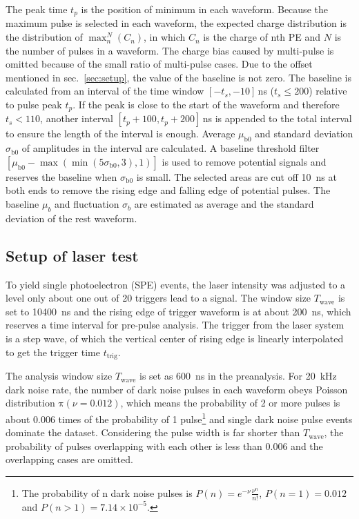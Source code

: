 The peak time $t_p$ is the position of minimum in each waveform. Because the maximum pulse is selected in each waveform, the expected charge distribution is the distribution of $\max_n^N(C_n)$, in which $C_n$ is the charge of nth PE and $N$ is the number of pulses in a waveform. The charge bias caused by multi-pulse is omitted because of the small ratio of multi-pulse cases. Due to the offset mentioned in sec.~\ref{sec:setup}, the value of the baseline is not zero. The baseline is calculated from an interval of the time window $[-t_s,-10]$\,ns ($t_s\leq200$) relative to pulse peak $t_p$. If the peak is close to the start of the waveform and therefore $t_s < 110$, another interval $[t_p+100,t_p+200]$\,ns is appended to the total interval to ensure the length of the interval is enough. Average $\mu_{\mathrm{b0}}$ and standard deviation $\sigma_{\mathrm{b0}}$ of amplitudes in the interval are calculated. A baseline threshold filter $[\mu_{\mathrm{b0}}-\max(\min(5\sigma_{\mathrm{b0}},3),1)]$ is used to remove potential signals and reserves the baseline when $\sigma_{\mathrm{b0}}$ is small. The selected areas are cut off \SI{10}{ns} at both ends to remove the rising edge and falling edge of potential pulses. The baseline $\mu_b$ and fluctuation $\sigma_b$ are estimated as average and the standard deviation of the rest waveform.

\subsection{Setup of laser test}
To yield single photoelectron (SPE) events, the laser intensity was adjusted to a level only about one out of 20 triggers lead to a signal. The window size $T_{\mathrm{wave}}$ is set to \SI{10400}{ns} and the rising edge of trigger waveform is at about \SI{200}{ns}, which reserves a time interval for pre-pulse analysis. The trigger from the laser system is a step wave, of which the vertical center of rising edge is linearly interpolated to get the trigger time $t_{\mathrm{trig}}$.

The analysis window size $T_{\mathrm{wave}}$ is set as \SI{600}{ns} in the preanalysis. For \SI{20}{kHz} dark noise rate, the number of dark noise pulses in each waveform obeys Poisson distribution $\mathrm{\pi}(\nu=0.012)$, which means the probability of 2 or more pulses is about 0.006 times of the probability of 1 pulse\footnote{The probability of n dark noise pulses is $P(n)=e^{-\nu}\frac{\nu^n}{n!}$, $P(n=1)=0.012$ and $P(n>1)=7.14\times10^{-5}$.} and single dark noise pulse events dominate the dataset. Considering the pulse width is far shorter than $T_{\mathrm{wave}}$, the probability of pulses overlapping with each other is less than 0.006 and the overlapping cases are omitted.

